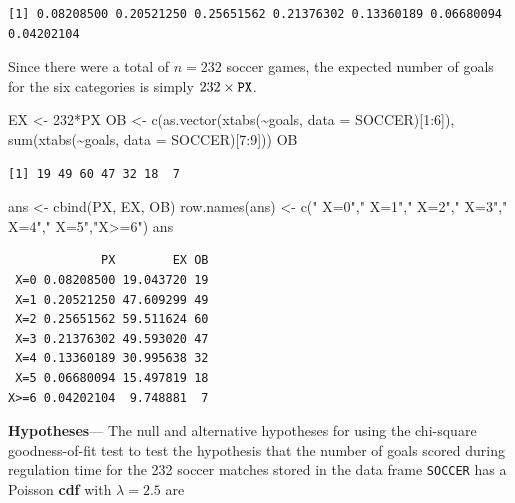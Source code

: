 \documentclass[
]{article}
\newenvironment{Shaded}{\begin{snugshade}}{\end{snugshade}}
\newcommand{\AttributeTok}[1]{\textcolor[rgb]{0.77,0.63,0.00}{#1}}
\newcommand{\DecValTok}[1]{\textcolor[rgb]{0.00,0.00,0.81}{#1}}
\newcommand{\FunctionTok}[1]{\textcolor[rgb]{0.00,0.00,0.00}{#1}}
\newcommand{\NormalTok}[1]{#1}
\newcommand{\OtherTok}[1]{\textcolor[rgb]{0.56,0.35,0.01}{#1}}
\newcommand{\SpecialCharTok}[1]{\textcolor[rgb]{0.00,0.00,0.00}{#1}}
\newcommand{\StringTok}[1]{\textcolor[rgb]{0.31,0.60,0.02}{#1}}
\begin{document}
\begin{verbatim}
[1] 0.08208500 0.20521250 0.25651562 0.21376302 0.13360189 0.06680094 0.04202104
\end{verbatim}

Since there were a total of \(n=232\) soccer games, the expected number of goals for the six categories is simply \(232 \times \tt{PX}\).

\begin{Shaded}
\begin{Highlighting}[]
\NormalTok{EX }\OtherTok{\textless{}{-}} \DecValTok{232}\SpecialCharTok{*}\NormalTok{PX}
\NormalTok{OB }\OtherTok{\textless{}{-}} \FunctionTok{c}\NormalTok{(}\FunctionTok{as.vector}\NormalTok{(}\FunctionTok{xtabs}\NormalTok{(}\SpecialCharTok{\textasciitilde{}}\NormalTok{goals, }\AttributeTok{data =}\NormalTok{ SOCCER)[}\DecValTok{1}\SpecialCharTok{:}\DecValTok{6}\NormalTok{]), }
        \FunctionTok{sum}\NormalTok{(}\FunctionTok{xtabs}\NormalTok{(}\SpecialCharTok{\textasciitilde{}}\NormalTok{goals, }\AttributeTok{data =}\NormalTok{ SOCCER)[}\DecValTok{7}\SpecialCharTok{:}\DecValTok{9}\NormalTok{]))}
\NormalTok{OB}
\end{Highlighting}
\end{Shaded}

\begin{verbatim}
[1] 19 49 60 47 32 18  7
\end{verbatim}

\begin{Shaded}
\begin{Highlighting}[]
\NormalTok{ans }\OtherTok{\textless{}{-}} \FunctionTok{cbind}\NormalTok{(PX, EX, OB)}
\FunctionTok{row.names}\NormalTok{(ans) }\OtherTok{\textless{}{-}} \FunctionTok{c}\NormalTok{(}\StringTok{" X=0"}\NormalTok{,}\StringTok{" X=1"}\NormalTok{,}\StringTok{" X=2"}\NormalTok{,}\StringTok{" X=3"}\NormalTok{,}\StringTok{" X=4"}\NormalTok{,}\StringTok{" X=5"}\NormalTok{,}\StringTok{"X\textgreater{}=6"}\NormalTok{)}
\NormalTok{ans}
\end{Highlighting}
\end{Shaded}

\begin{verbatim}
             PX        EX OB
 X=0 0.08208500 19.043720 19
 X=1 0.20521250 47.609299 49
 X=2 0.25651562 59.511624 60
 X=3 0.21376302 49.593020 47
 X=4 0.13360189 30.995638 32
 X=5 0.06680094 15.497819 18
X>=6 0.04202104  9.748881  7
\end{verbatim}

\textbf{Hypotheses}--- The null and alternative hypotheses for using the chi-square goodness-of-fit test to test the hypothesis that the number of goals scored during regulation time for the 232 soccer matches stored in the data frame \texttt{SOCCER} has a Poisson \textbf{cdf} with \(\lambda=2.5\) are
\end{document}

